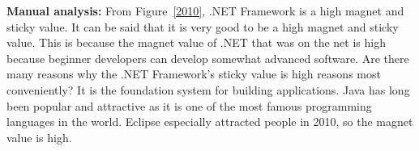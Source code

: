 \documentclass[conference]{IEEEtran}
\begin{document}
\medskip



\textbf{Manual analysis:}
From Figure~\ref{2010}, .NET Framework is a high magnet and sticky value. It can be said that it is very good to be a high magnet and sticky value. This is because the magnet value of .NET that was on the net is high because beginner developers can develop somewhat advanced software. Are there many reasons why the .NET Framework's sticky value is high reasons most conveniently? It is the foundation system for building applications. Java has long been popular and attractive as it is one of the most famous programming languages ​​in the world. Eclipse especially attracted people in 2010, so the magnet value is high.
\medskip

\end{document}
